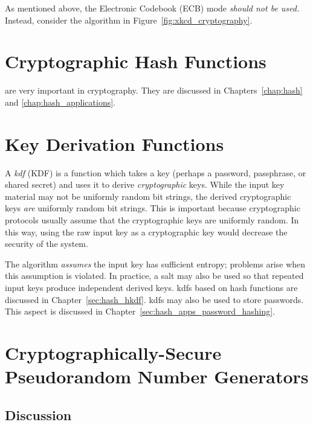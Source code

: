 As mentioned above, the Electronic Codebook (ECB) mode
\emph{should not be used.}
Instead, consider the algorithm in Figure~\ref{fig:xkcd_cryptography}.





\section{Cryptographic Hash Functions}

 are very important in cryptography.
They are discussed in Chapters~\ref{chap:hash}
and \ref{chap:hash_applications}.



\section{Key Derivation Functions}
\label{sec:kdf}

A \emph{\gls{kdf}} (KDF) is a function which takes
a key (perhaps a password, passphrase, or \gls{shared secret})
and uses it to derive \emph{cryptographic} keys.
While the input key material may not be uniformly random bit strings,
the derived cryptographic keys \emph{are} uniformly random bit strings.
This is important because cryptographic protocols usually assume
that the cryptographic keys are uniformly random.
In this way, using the raw input key as a cryptographic key
would decrease the security of the system.

The algorithm \emph{assumes} the input key has sufficient entropy;
problems arise when this assumption is violated.
In practice, a \gls{salt} may also be used so that repeated
input keys produce independent derived keys.
\Glspl{kdf} based on \glspl{hash function} are discussed
in Chapter~\ref{sec:hash_hkdf}.
\Glspl{kdf} may also be used to store passwords.
This aspect is discussed in
Chapter~\ref{sec:hash_apps_password_hashing}.



\section{Cryptographically-Secure Pseudorandom Number Generators}
\label{sec:csprng}

\subsection{Discussion}

